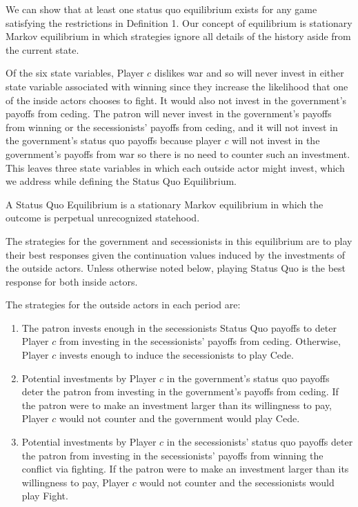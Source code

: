 We can show that at least one status quo equilibrium exists for any game satisfying the restrictions in Definition 1. Our concept of equilibrium is stationary Markov equilibrium in which strategies ignore all details of the history aside from the current state.

Of the six state variables, Player $c$ dislikes war and so will never invest in either state variable associated with winning since they increase the likelihood that one of the inside actors chooses to fight. It would also not invest in the government's payoffs from ceding. The patron will never invest in the government's payoffs from winning or the secessionists' payoffs from ceding, and it will not invest in the government's status quo payoffs because player $c$ will not invest in the government's payoffs from war so there is no need to counter such an investment. This leaves three state variables in which each outside actor might invest, which we address while defining the Status Quo Equilibrium. 

\begin{definition}
A Status Quo Equilibrium is a stationary Markov equilibrium in which the outcome is perpetual unrecognized statehood.

The strategies for the government and secessionists in this equilibrium are to play their best responses given the continuation values induced by the investments of the outside actors. Unless otherwise noted below, playing Status Quo is the best response for both inside actors.

The strategies for the outside actors in each period are:

\begin{enumerate}
	\item The patron invests enough in the secessionists Status Quo payoffs to deter Player $c$ from investing in the secessionists' payoffs from ceding. Otherwise, Player $c$ invests enough to induce the secessionists to play Cede.

	\item Potential investments by Player $c$ in the government's status quo payoffs deter the patron from investing in the government's payoffs from ceding. If the patron were to make an investment larger than its willingness to pay, Player $c$ would not counter and the government would play Cede.
	
	\item Potential investments by Player $c$ in the secessionists' status quo payoffs deter the patron from investing in the secessionists' payoffs from winning the conflict via fighting. If the patron were to make an investment larger than its willingness to pay, Player $c$ would not counter and the secessionists would play Fight.
\end{enumerate}
\end{definition}

